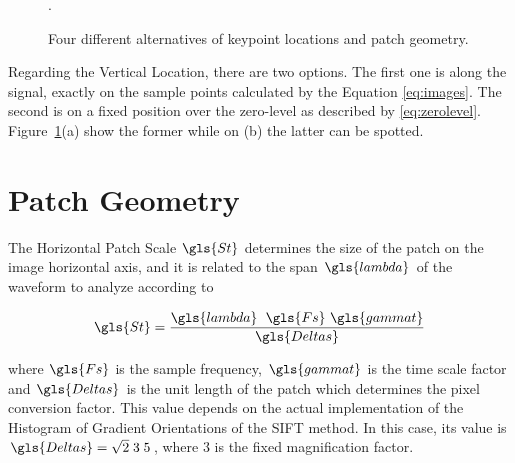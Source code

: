 \begin{figure}[h!]
\caption[Keypoint Locations]{Four different alternatives of keypoint locations and patch geometry.}.
\label{fig:keypointlocations}
\end{figure}

Regarding the Vertical Location, there are two options.  The first one is along the signal, exactly on the sample points calculated by the Equation \ref{eq:images}.  The second is on a fixed position over the zero-level as described by \ref{eq:zerolevel}.  Figure~\ref{fig:keypointlocations}(a) show the former while on (b) the latter can be spotted.

\section{Patch Geometry}
\label{patchgeometry}


The Horizontal Patch Scale $\gls{St}$ determines the size of the patch on the image horizontal axis, and it is related to the span $\gls{lambda}$ of the waveform to analyze according to

\begin{equation}
\gls{St} = \frac{ \gls{lambda} \;  \  \gls{Fs} \ \gls{gammat} }{\gls{Deltas}}
\label{eq:horizontalpatchscale}
\end{equation}

\noindent where $\gls{Fs}$ is the sample frequency, $\gls{gammat}$ is the time scale factor and $\gls{Deltas}$ is the unit length of the patch which determines the pixel conversion factor.  This value depends on the actual implementation of the Histogram of Gradient Orientations of the SIFT method. In this case, its value is $\gls{Deltas} = \sqrt{2} \; 3 \; 5$, where $3$ is the fixed magnification factor.  

